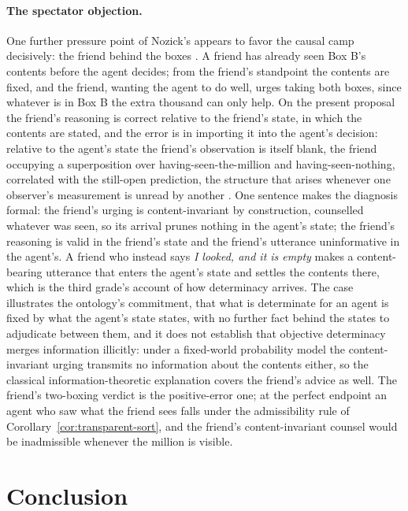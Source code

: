 \paragraph{The spectator objection.} One further pressure point of Nozick's appears to favor the causal camp decisively: the friend behind the boxes \cite{nozick1969newcomb}. A friend has already seen Box B's contents before the agent decides; from the friend's standpoint the contents are fixed, and the friend, wanting the agent to do well, urges taking both boxes, since whatever is in Box B the extra thousand can only help. On the present proposal the friend's reasoning is correct relative to the friend's state, in which the contents are stated, and the error is in importing it into the agent's decision: relative to the agent's state the friend's observation is itself blank, the friend occupying a superposition over having-seen-the-million and having-seen-nothing, correlated with the still-open prediction, the structure that arises whenever one observer's measurement is unread by another \cite{Aethus}. One sentence makes the diagnosis formal: the friend's urging is content-invariant by construction, counselled whatever was seen, so its arrival prunes nothing in the agent's state; the friend's reasoning is valid in the friend's state and the friend's utterance uninformative in the agent's. A friend who instead says \emph{I looked, and it is empty} makes a content-bearing utterance that enters the agent's state and settles the contents there, which is the third grade's account of how determinacy arrives. The case illustrates the ontology's commitment, that what is determinate for an agent is fixed by what the agent's state states, with no further fact behind the states to adjudicate between them, and it does not establish that objective determinacy merges information illicitly: under a fixed-world probability model the content-invariant urging transmits no information about the contents either, so the classical information-theoretic explanation covers the friend's advice as well. The friend's two-boxing verdict is the positive-error one; at the perfect endpoint an agent who saw what the friend sees falls under the admissibility rule of Corollary~\ref{cor:transparent-sort}, and the friend's content-invariant counsel would be inadmissible whenever the million is visible.

\section{Conclusion}
\label{sec:conclusion}

